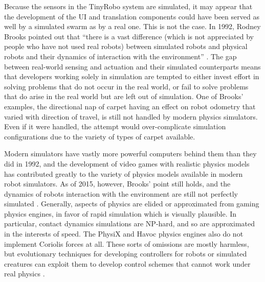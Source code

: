Because the sensors in the TinyRobo system are simulated, it may appear that the development of the UI and translation components could have been served as well by a simulated swarm as by a real one. 
This is not the case. 
In 1992, Rodney Brooks pointed out that ``there is a vast difference (which is not appreciated by people who have not used real robots) between simulated robots and physical robots and their dynamics of interaction with the environment'' \citep{brooks1992artificial}. 
The gap between real-world sensing and actuation and their simulated counterparts means that developers working solely in simulation are tempted to either invest effort in solving problems that do not occur in the real world, or fail to solve problems that do arise in the real world but are left out of simulation. 
One of Brooks' examples, the directional nap of carpet having an effect on robot odometry that varied with direction of travel, is still not handled by modern physics simulators. 
Even if it were handled, the attempt would over-complicate simulation configurations due to the variety of types of carpet available. 

Modern simulators have vastly more powerful computers behind them than they did in 1992, and the development of video games with realistic physics models has contributed greatly to the variety of physics models available in modern robot simulators. 
As of 2015, however, Brooks' point still holds, and the dynamics of robots interaction with the environment are still not perfectly simulated \citep{erez2015simulation}.
Generally, aspects of physics are elided or approximated from gaming physics engines, in favor of rapid simulation which is visually plausible. 
In particular, contact dynamics simulations are NP-hard, and so are approximated in the interests of speed. 
The PhysiX and Havoc physics engines also do not implement Coriolis forces at all.
These sorts of omissions are mostly harmless, but evolutionary techniques for developing controllers for robots or simulated creatures can exploit them to develop control schemes that cannot work under real physics \citep{Brooks2000}. 

